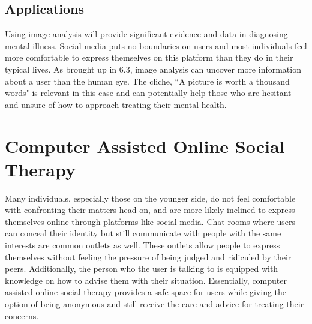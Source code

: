 \documentclass[11pt,technote,twocolumn]{IEEEtran}
\begin{document}
\subsection{Applications}
Using image analysis will provide significant evidence and data in diagnosing mental illness. Social media puts no boundaries on users and most individuals feel more comfortable to express themselves on this platform than they do in their typical lives. As brought up in 6.3, image analysis can uncover more information about a user than the human eye. The cliche, ``A picture is worth a thousand words" is relevant in this case and can potentially help those who are hesitant and unsure of how to approach treating their mental health.
\section{Computer Assisted Online Social Therapy}
Many individuals, especially those on the younger side, do not feel comfortable with confronting their matters head-on, and are more likely inclined to express themselves online through platforms like social media. Chat rooms where users can conceal their identity but still communicate with people with the same interests are common outlets as well. These outlets allow people to express themselves without feeling the pressure of being judged and ridiculed by their peers. Additionally, the person who the user is talking to is equipped with knowledge on how to advise them with their situation. Essentially, computer assisted online social therapy provides a safe space for users while giving the option of being anonymous and still receive the care and advice for treating their concerns.
\end{document}
